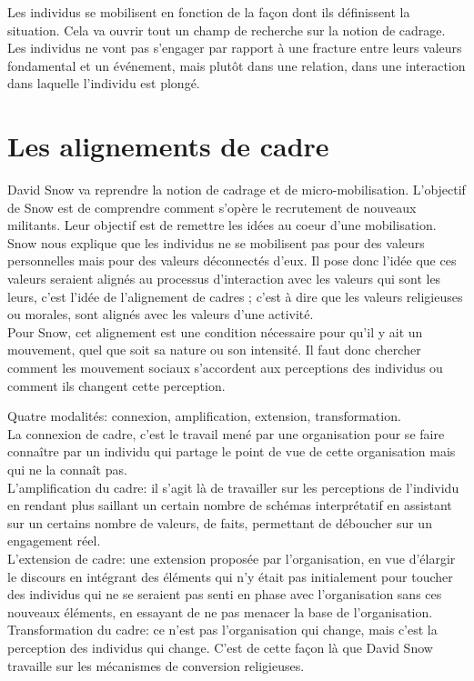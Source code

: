 \documentclass[10pt, a4paper, openany]{book}
\begin{document}
Les individus se mobilisent en fonction de la façon dont ils définissent la situation. Cela va ouvrir tout un champ de recherche sur la notion de cadrage. \\
Les individus ne vont pas s'engager par rapport à une fracture entre leurs valeurs fondamental et un événement, mais plutôt dans une relation, dans une interaction dans laquelle l'individu est plongé.

\section{Les alignements de cadre}

David Snow va reprendre la notion de cadrage et de micro-mobilisation. L'objectif de Snow est de comprendre comment s'opère le recrutement de nouveaux militants. Leur objectif est de remettre les idées au coeur d'une mobilisation. \\
Snow nous explique que les individus ne se mobilisent pas pour des valeurs personnelles mais pour des valeurs déconnectés d'eux. Il pose donc l'idée que ces valeurs seraient alignés au processus d'interaction avec les valeurs qui sont les leurs, c'est l'idée de l'alignement de cadres ; c'est à dire que les valeurs religieuses ou morales, sont alignés avec les valeurs d'une activité. \\
Pour Snow, cet alignement est une condition nécessaire pour qu'il y ait un mouvement, quel que soit sa nature ou son intensité. Il faut donc chercher comment les mouvement sociaux s'accordent aux perceptions des individus ou comment ils changent cette perception.


Quatre modalités: connexion, amplification, extension, transformation. \\
La connexion de cadre, c'est le travail mené par une organisation pour se faire connaître par un individu qui partage le point de vue de cette organisation mais qui ne la connaît pas. \\
L'amplification du cadre: il s'agit là de travailler sur les perceptions de l'individu en rendant plus saillant un certain nombre de schémas interprétatif en assistant sur un certains nombre de valeurs, de faits, permettant de déboucher sur un engagement réel. \\
L'extension de cadre: une extension proposée par l'organisation, en vue d'élargir le discours en intégrant des éléments qui n'y était pas initialement pour toucher des individus qui ne se seraient pas senti en phase avec l'organisation sans ces nouveaux éléments, en essayant de ne pas menacer la base de l'organisation. \\
Transformation du cadre: ce n'est pas l'organisation qui change, mais c'est la perception des individus qui change. C'est de cette façon là que David Snow travaille sur les mécanismes de conversion religieuses. 
\end{document}
